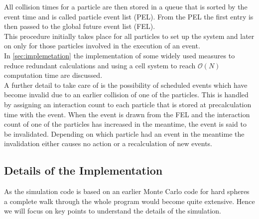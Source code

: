 All collision times for a particle are then stored in a queue that is sorted by the event time and is called particle event list (PEL). From the PEL the first entry is then passed to the global future event list (FEL).\\
This procedure initially takes place for all particles to set up the system and later on only for those particles involved in the execution of an event.\\ 

In \autoref{sec:implemetation} the implementation of some widely used measures to reduce redundant calculations and using a cell system to reach $\mathcal{O}(N)$ computation time are discussed.\\

A further detail to take care of is the possibility of scheduled events which have become invalid due to an earlier collision of one of the particles. This is handled by assigning an interaction count to each particle that is stored at precalculation time with the event. When the event is drawn from the FEL and the interaction count of one of the particles has increased in the meantime, the event is said to be invalidated. Depending on which particle had an event in the meantime the invalidation either causes no action or a recalculation of new events.\\  

\subsection{Details of the Implementation} 
\label{sec:implemetation}
As the simulation code is based on an earlier Monte Carlo code for hard spheres a complete walk through the whole program would become quite extensive. Hence we will focus on key points to understand the details of the simulation.\\

